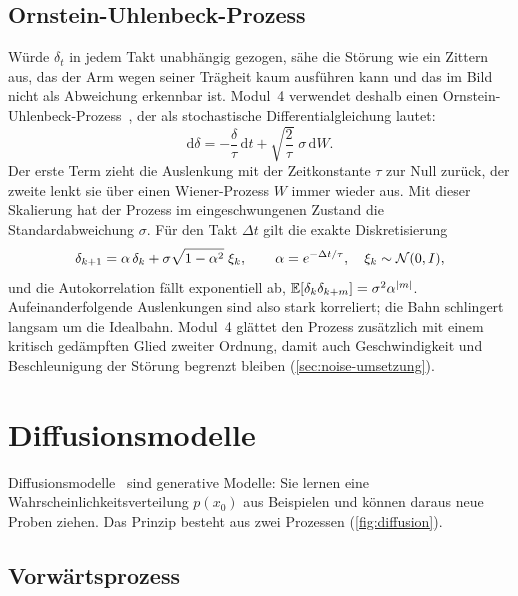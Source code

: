 \subsection{Ornstein-Uhlenbeck-Prozess}

Würde $\delta_t$ in jedem Takt unabhängig gezogen, sähe die Störung wie ein Zittern aus, das
der Arm wegen seiner Trägheit kaum ausführen kann und das im Bild nicht als Abweichung
erkennbar ist. Modul~4 verwendet deshalb einen Ornstein-Uhlenbeck-Prozess~\cite{uhlenbeck1930},
der als stochastische Differentialgleichung lautet:
\begin{equation}
  \mathrm{d}\delta = -\frac{\delta}{\tau}\,\mathrm{d}t + \sqrt{\frac{2}{\tau}}\;\sigma\,\mathrm{d}W .
  \label{eq:ou-sde}
\end{equation}
Der erste Term zieht die Auslenkung mit der Zeitkonstante $\tau$ zur Null zurück, der zweite
lenkt sie über einen Wiener-Prozess $W$ immer wieder aus. Mit dieser Skalierung hat der
Prozess im eingeschwungenen Zustand die Standardabweichung $\sigma$. Für den Takt $\Delta t$
gilt die exakte Diskretisierung
\begin{equation}
  \delta_{k+1} = \alpha\,\delta_k + \sigma\sqrt{1 - \alpha^2}\;\xi_k,
  \qquad \alpha = e^{-\Delta t / \tau},\quad \xi_k \sim \mathcal{N}(0, I) ,
  \label{eq:ou-diskret}
\end{equation}
und die Autokorrelation fällt exponentiell ab,
$\mathbb{E}[\delta_k \delta_{k+m}] = \sigma^2 \alpha^{|m|}$. Aufeinanderfolgende Auslenkungen sind
also stark korreliert; die Bahn schlingert langsam um die Idealbahn. Modul~4 glättet den
Prozess zusätzlich mit einem kritisch gedämpften Glied zweiter Ordnung, damit auch
Geschwindigkeit und Beschleunigung der Störung begrenzt bleiben
(\cref{sec:noise-umsetzung}).

\section{Diffusionsmodelle}
\label{sec:diffusion}

Diffusionsmodelle~\cite{sohldickstein2015,ho2020} sind generative Modelle: Sie lernen eine
Wahrscheinlichkeitsverteilung $p(x_0)$ aus Beispielen und können daraus neue Proben ziehen.
Das Prinzip besteht aus zwei Prozessen (\cref{fig:diffusion}).

\subsection{Vorwärtsprozess}

